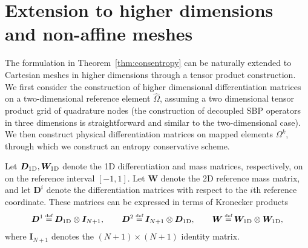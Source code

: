 \documentclass[review,onefignum,onetabnum,final]{siamart171218}
\renewcommand{\hat}{\widehat}
\newcommand\myeq{\mathrel{\stackrel{\makebox[0pt]{\mbox{\normalfont\tiny def}}}{=}}}
\begin{document}
\section{Extension to higher dimensions and non-affine meshes}
\label{sec:2}

The formulation in Theorem~\ref{thm:consentropy} can be naturally extended to Cartesian meshes in higher dimensions through a tensor product construction.  We first consider the construction of higher dimensional differentiation matrices on a two-dimensional reference element $\hat{\Omega}$, assuming a two dimensional tensor product grid of quadrature nodes (the construction of decoupled SBP operators in three dimensions is straightforward and similar to the two-dimensional case).  We then construct physical differentiation matrices on mapped elements $\Omega^k$, through which we construct an entropy conservative scheme.  

Let $\bm{D}_{\rm 1D}, \bm{W}_{\rm 1D}$ denote the 1D differentiation and mass matrices, respectively, on on the reference interval $[-1,1]$.  Let ${\bm{W}}$ denote the 2D reference mass matrix, and let ${\bm{D}}^i$ denote the differentiation matrices with respect to the $i$th reference coordinate.  These matrices can be expressed in terms of Kronecker products  
\[
{\bm{D}}^1 \myeq \bm{D}_{\rm 1D} \otimes \bm{I}_{N+1}, \qquad {\bm{D}}^2  \myeq \bm{I}_{N+1} \otimes \bm{D}_{\rm 1D}, \qquad {\bm{W}} \myeq \bm{W}_{\rm 1D} \otimes  \bm{W}_{\rm 1D}, 
\]
where $\bm{I}_{N+1}$ denotes the $(N+1)\times (N+1)$ identity matrix.  %
\end{document}
